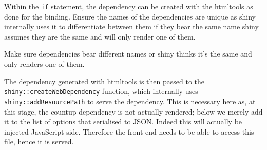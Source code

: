 \documentclass[
]{krantz}
\makeatletter
\newenvironment{Shaded}{\begin{snugshade}}{\end{snugshade}}
\newcommand{\CommentTok}[1]{\textcolor[rgb]{0.37,0.37,0.37}{\textit{#1}}}
\newcommand{\ControlFlowTok}[1]{\textcolor[rgb]{0.27,0.27,0.27}{\textbf{#1}}}
\newcommand{\DataTypeTok}[1]{\textcolor[rgb]{0.27,0.27,0.27}{#1}}
\newcommand{\KeywordTok}[1]{\textcolor[rgb]{0.27,0.27,0.27}{\textbf{#1}}}
\newcommand{\NormalTok}[1]{#1}
\newcommand{\OperatorTok}[1]{\textcolor[rgb]{0.43,0.43,0.43}{\textbf{#1}}}
\newcommand{\OtherTok}[1]{\textcolor[rgb]{0.37,0.37,0.37}{#1}}
\newcommand{\StringTok}[1]{\textcolor[rgb]{0.5,0.5,0.5}{#1}}
\newenvironment{kframe}{%
\medskip{}
\setlength{\fboxsep}{.8em}
 \def\at@end@of@kframe{}%
 \ifinner\ifhmode%
  \def\at@end@of@kframe{\end{minipage}}%
  \begin{minipage}{\columnwidth}%
 \fi\fi%
 \def\FrameCommand##1{\hskip\@totalleftmargin \hskip-\fboxsep
 \colorbox{shadecolor}{##1}\hskip-\fboxsep
     \hskip-\linewidth \hskip-\@totalleftmargin \hskip\columnwidth}%
 \MakeFramed {\advance\hsize-\width
   \@totalleftmargin\z@ \linewidth\hsize
   \@setminipage}}%
 {\par\unskip\endMakeFramed%
 \at@end@of@kframe}
\renewenvironment{Shaded}{\begin{kframe}}{\end{kframe}}
\newenvironment{rmdblock}[1]
  {
  \begin{itemize}
  \renewcommand{\labelitemi}{
    \raisebox{-.7\height}[0pt][0pt]{
      {\setkeys{Gin}{width=3em,keepaspectratio}\texttt{[image: images/\#1]}}
    }
  }
  \setlength{\fboxsep}{1em}
  \begin{kframe}
  \item
  }
  {
  \end{kframe}
  \end{itemize}
  }
\newenvironment{rmdnote}
  {\begin{rmdblock}{note}}
  {\end{rmdblock}}
\makeatother
\begin{document}
\begin{Shaded}
\end{Shaded}

Within the \texttt{if} statement, the dependency can be created with the htmltools as done for the binding. Ensure the names of the dependencies are unique as shiny internally uses it to differentiate between them if they bear the same name shiny assumes they are the same and will only render one of them.

\begin{rmdnote}
Make sure dependencies bear different names or shiny thinks it's the
same and only renders one of them.
\end{rmdnote}

The dependency generated with htmltools is then passed to the \texttt{shiny::createWebDependency} function, which internally uses \texttt{shiny::addResourcePath} to serve the dependency. This is necessary here as, at this stage, the countup dependency is not actually rendered; below we merely add it to the list of options that serialised to JSON. Indeed this will actually be injected JavaScript-side. Therefore the front-end needs to be able to access this file, hence it is served.
\end{document}
